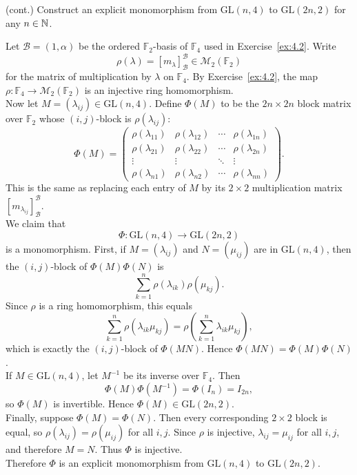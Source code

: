 \documentclass[../Odyssey_Project.tex]{subfiles}
\begin{document}
\begin{exercise}
\label{ex:4.3}
(cont.) Construct an explicit monomorphism from $\mathrm{GL}(n, 4)$ to $\mathrm{GL}(2n, 2)$ for any $n \in \mathbb{N}$.
\end{exercise}
\begin{solution}
Let $\mathcal B=(1,\alpha)$ be the ordered $\mathbb{F}_2$-basis of $\mathbb{F}_4$ used in Exercise~\ref{ex:4.2}. Write
\[
    \rho(\lambda)=[m_\lambda]_{\mathcal B}^{\mathcal B}
    \in \mathcal{M}_2(\mathbb{F}_2)
\]
for the matrix of multiplication by $\lambda$ on $\mathbb{F}_4$. By Exercise~\ref{ex:4.2}, the map $\rho\colon \mathbb{F}_4\to \mathcal{M}_2(\mathbb{F}_2)$ is an injective ring homomorphism.\\
Now let $M=(\lambda_{ij})\in \mathrm{GL}(n,4)$. Define $\Phi(M)$ to be the $2n\times 2n$ block matrix over $\mathbb{F}_2$ whose $(i,j)$-block is $\rho(\lambda_{ij})$:
\[
    \Phi(M)=
    \begin{pmatrix}
        \rho(\lambda_{11})&\rho(\lambda_{12})&\cdots&\rho(\lambda_{1n})\\
        \rho(\lambda_{21})&\rho(\lambda_{22})&\cdots&\rho(\lambda_{2n})\\
        \vdots&\vdots&\ddots&\vdots\\
        \rho(\lambda_{n1})&\rho(\lambda_{n2})&\cdots&\rho(\lambda_{nn})
    \end{pmatrix}.
\]
This is the same as replacing each entry of $M$ by its $2\times2$ multiplication matrix $[m_{\lambda_{ij}}]_{\mathcal B}^{\mathcal B}$.\\
We claim that
\[
    \Phi\colon \mathrm{GL}(n,4)\to \mathrm{GL}(2n,2)
\]
is a monomorphism. First, if $M=(\lambda_{ij})$ and $N=(\mu_{ij})$ are in $\mathrm{GL}(n,4)$, then the $(i,j)$-block of $\Phi(M)\Phi(N)$ is
\[
    \sum_{k=1}^n \rho(\lambda_{ik})\rho(\mu_{kj}).
\]
Since $\rho$ is a ring homomorphism, this equals
\[
    \sum_{k=1}^n \rho(\lambda_{ik}\mu_{kj})
    =
    \rho\left(\sum_{k=1}^n \lambda_{ik}\mu_{kj}\right),
\]
which is exactly the $(i,j)$-block of $\Phi(MN)$. Hence $\Phi(MN)=\Phi(M)\Phi(N)$.\\
If $M\in \mathrm{GL}(n,4)$, let $M^{-1}$ be its inverse over $\mathbb{F}_4$. Then
\[
    \Phi(M)\Phi(M^{-1})=\Phi(I_n)=I_{2n},
\]
so $\Phi(M)$ is invertible. Hence $\Phi(M)\in \mathrm{GL}(2n,2)$.\\
Finally, suppose $\Phi(M)=\Phi(N)$. Then every corresponding $2\times2$ block is equal, so $\rho(\lambda_{ij})=\rho(\mu_{ij})$ for all $i,j$. Since $\rho$ is injective, $\lambda_{ij}=\mu_{ij}$ for all $i,j$, and therefore $M=N$. Thus $\Phi$ is injective.\\
Therefore $\Phi$ is an explicit monomorphism from $\mathrm{GL}(n,4)$ to $\mathrm{GL}(2n,2)$.
\end{solution}
\end{document}
